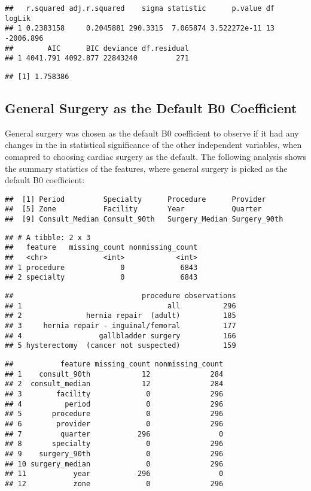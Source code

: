 \documentclass[]{article}
\begin{document}
\begin{verbatim}
##   r.squared adj.r.squared    sigma statistic      p.value df    logLik
## 1 0.2383158     0.2045881 290.3315  7.065874 3.522272e-11 13 -2006.896
##        AIC      BIC deviance df.residual
## 1 4041.791 4092.877 22843240         271
\end{verbatim}

\begin{verbatim}
## [1] 1.758386
\end{verbatim}

\subsection{General Surgery as the Default B0
Coefficient}\label{general-surgery-as-the-default-b0-coefficient}

General surgery was chosen as the default B0 coefficient to observe if
it had any changes in the in statistical significance of the other
independent variables, when comapred to choosing cardiac surgery as the
default. The following analysis shows the summary statistics of the
features, where general surgery is picked as the default B0 coefficient:

\begin{verbatim}
##  [1] Period         Specialty      Procedure      Provider      
##  [5] Zone           Facility       Year           Quarter       
##  [9] Consult_Median Consult_90th   Surgery_Median Surgery_90th
\end{verbatim}

\begin{verbatim}
## # A tibble: 2 x 3
##   feature   missing_count nonmissing_count
##   <chr>             <int>            <int>
## 1 procedure             0             6843
## 2 specialty             0             6843
\end{verbatim}

\begin{verbatim}
##                              procedure observations
## 1                                  all          296
## 2               hernia repair  (adult)          185
## 3     hernia repair - inguinal/femoral          177
## 4                  gallbladder surgery          166
## 5 hysterectomy  (cancer not suspected)          159
\end{verbatim}

\begin{verbatim}
##           feature missing_count nonmissing_count
## 1    consult_90th            12              284
## 2  consult_median            12              284
## 3        facility             0              296
## 4          period             0              296
## 5       procedure             0              296
## 6        provider             0              296
## 7         quarter           296                0
## 8       specialty             0              296
## 9    surgery_90th             0              296
## 10 surgery_median             0              296
## 11           year           296                0
## 12           zone             0              296
\end{verbatim}
\end{document}
